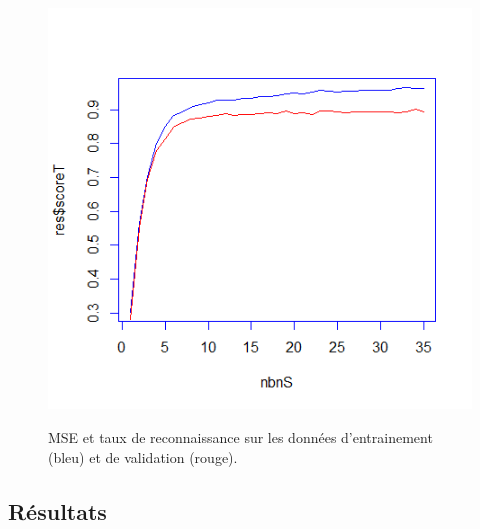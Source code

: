 \begin{figure}
\begin{minipage}{0.5\linewidth}
\includegraphics[width=\linewidth]{Figures/score_nn}
\label{fig:score}
\end{minipage}
\caption{MSE et taux de reconnaissance sur les données d'entrainement (bleu) et de validation (rouge).}
\end{figure}
\subsection{Résultats}

